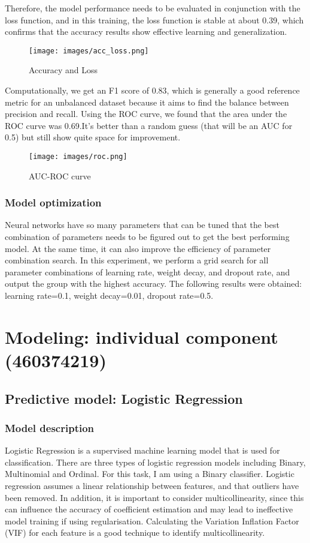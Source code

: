 \documentclass[10pt]{article}
\begin{document}
Therefore, the model performance needs to be evaluated in conjunction with the loss function, and in this training, the loss function is stable at about 0.39, which confirms that the accuracy results show effective learning and generalization. 
\begin{figure}[H]
    \centering
    \texttt{[image: images/acc\_loss.png]}
    \caption{Accuracy and Loss}
    \label{fig:accuracy-loss-lucia}
\end{figure}
Computationally, we get an F1 score of 0.83, which is generally a good reference metric for an unbalanced dataset because it aims to find the balance between precision and recall. Using the ROC curve, we found that the area under the ROC curve was 0.69.It's better than a random guess (that will be an AUC for 0.5) but still show quite space for improvement.
\begin{figure}[H]
    \centering
    \texttt{[image: images/roc.png]}
    \caption{AUC-ROC curve}
    \label{fig:roc-lucia}
\end{figure}
\subsubsection{Model optimization}
Neural networks have so many parameters that can be tuned that the best combination of parameters needs to be figured out to get the best performing model. At the same time, it can also improve the efficiency of parameter combination search. In this experiment, we perform a grid search for all parameter combinations of learning rate, weight decay, and dropout rate, and output the group with the highest accuracy. The following results were obtained: learning rate=0.1, weight decay=0.01, dropout rate=0.5.
\pagebreak
\section{Modeling: individual component (460374219)}
\subsection{Predictive model: Logistic Regression}
\subsubsection{Model description}
Logistic Regression is a supervised machine learning model that is used for classification. There are three types of logistic regression models including Binary, Multinomial and Ordinal. For this task, I am using a Binary classifier. Logistic regression assumes a linear relationship between features, and that outliers have been removed. In addition, it is important to consider multicollinearity, since this can influence the accuracy of coefficient estimation and may lead to ineffective model training if using regularisation. Calculating the Variation Inflation Factor (VIF) for each feature is a good technique to identify multicollinearity.
\end{document}
